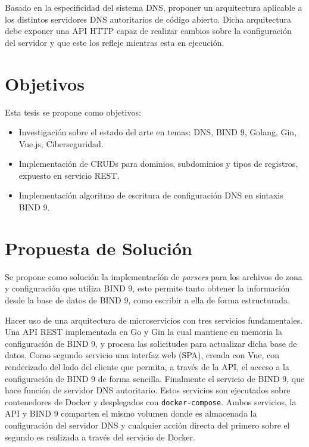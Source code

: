 Basado en la especificidad del sistema DNS, proponer un arquitectura aplicable a los distintos servidores DNS autoritarios de código abierto. Dicha arquitectura debe exponer una API HTTP capaz de realizar cambios sobre la configuración del servidor y que este los refleje mientras esta en ejecución.

\section{Objetivos}
Esta tesis se propone como objetivos:
\begin{itemize}
    \item Investigación sobre el estado del arte en temas: DNS, BIND 9, Golang, Gin, Vue.js, Ciberseguridad.
    \item Implementación de CRUDs para dominios, subdominios y tipos de registros, expuesto en servicio REST.
    \item Implementación algoritmo de escritura de configuración DNS en sintaxis BIND 9.
\end{itemize}



\section{Propuesta de Solución}

Se propone como solución la implementacíón de \textit{parsers} para los archivos de zona y configuración que utiliza BIND 9, esto permite tanto obtener la información desde la base de datos de BIND 9, como escribir a ella de forma estructurada.

Hacer uso de una arquitectura de microservicios con tres servicios fundamentales. Una API REST implementada en Go y Gin la cual mantiene en memoria la configuración de BIND 9,  y procesa las solicitudes para actualizar dicha base de datos. Como segundo servicio una interfaz web (SPA), creada con Vue, con renderizado del lado del cliente que permita, a través de la API, el acceso a la configuración de BIND 9 de forma sencilla. Finalmente el servicio de BIND 9, que hace función de servidor DNS autoritario. Estos servicios son ejecutados sobre contenedores de Docker y desplegados con \verb+docker-compose+. Ambos servicios, la API y BIND 9 comparten el mismo volumen donde es almacenada la configuración del servidor DNS y cualquier acción directa del primero sobre el segundo es realizada a través del servicio de Docker.

